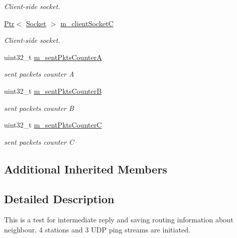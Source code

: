 \begin{DoxyCompactItemize}
\begin{DoxyCompactList}\small\item\em Client-\/side socket. \end{DoxyCompactList}\item 
\hyperlink{classns3_1_1Ptr}{Ptr}$<$ \hyperlink{classns3_1_1Socket}{Socket} $>$ \hyperlink{classHwmpDoRfRegressionTest_adf6b06c63c1c0fbca188cdd2320a3fa8}{m\+\_\+client\+SocketC}
\begin{DoxyCompactList}\small\item\em Client-\/side socket. \end{DoxyCompactList}\item 
uint32\+\_\+t \hyperlink{classHwmpDoRfRegressionTest_a7e9db73343cdfca6ed020385e1d885c7}{m\+\_\+sent\+Pkts\+CounterA}
\begin{DoxyCompactList}\small\item\em sent packets counter A \end{DoxyCompactList}\item 
uint32\+\_\+t \hyperlink{classHwmpDoRfRegressionTest_ade43bb8fd9548c572bac08b86fb842c7}{m\+\_\+sent\+Pkts\+CounterB}
\begin{DoxyCompactList}\small\item\em sent packets counter B \end{DoxyCompactList}\item 
uint32\+\_\+t \hyperlink{classHwmpDoRfRegressionTest_a91d999821c87cc806f68d5e61ad04c43}{m\+\_\+sent\+Pkts\+CounterC}
\begin{DoxyCompactList}\small\item\em sent packets counter C \end{DoxyCompactList}\end{DoxyCompactItemize}
\subsection*{Additional Inherited Members}


\subsection{Detailed Description}
This is a test for intermediate reply and saving routing information about neighbour. 4 stations and 3 U\+DP ping streams are initiated. 

